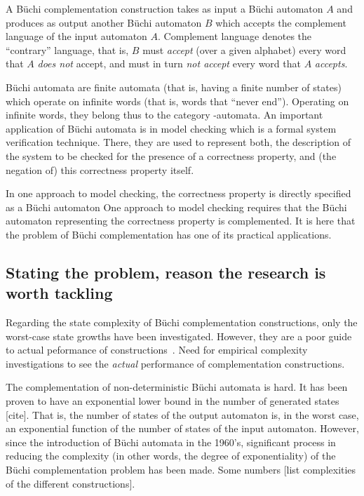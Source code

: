 A Büchi complementation construction takes as input a Büchi automaton $A$ and produces as output another Büchi automaton $B$ which accepts the complement language of the input automaton $A$. Complement language denotes the ``contrary'' language, that is, $B$ must \emph{accept} (over a given alphabet) every word that $A$ \emph{does not} accept, and must in turn \emph{not accept} every word that $A$ \emph{accepts}.

Büchi automata are finite automata (that is, having a finite number of states) which operate on infinite words (that is, words that ``never end''). Operating on infinite words, they belong thus to the category \om-automata. An important application of Büchi automata is in model checking which is a formal system verification technique. There, they are used to represent both, the description of the system to be checked for the presence of a correctness property, and (the negation of) this correctness property itself.

In one approach to model checking, the correctness property is directly specified as a Büchi automaton
One approach to model checking requires that the Büchi automaton representing the correctness property is complemented. It is here that the problem of Büchi complementation has one of its practical applications. 

\subsection{Stating the problem, reason the research is worth tackling}

Regarding the state complexity of Büchi complementation constructions, only the worst-case state growths have been investigated. However, they are a poor guide to actual peformance of constructions~\cite{2011_tsai}. Need for empirical complexity investigations to see the \textit{actual} performance of complementation constructions.

The complementation of non-deterministic Büchi automata is hard. It has been proven to have an exponential lower bound in the number of generated states [cite]. That is, the number of states of the output automaton is, in the worst case, an exponential function of the number of states of the input automaton. However, since the introduction of Büchi automata in the 1960's, significant process in reducing the complexity (in other words, the degree of exponentiality) of the Büchi complementation problem has been made. Some numbers [list complexities of the different constructions].

